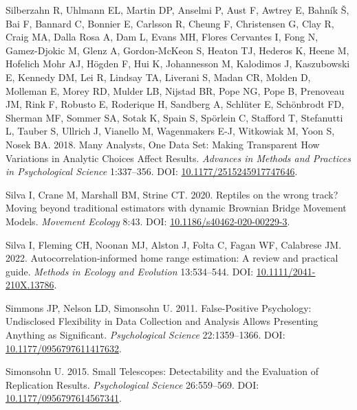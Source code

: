 \documentclass[10pt,a4paper]{article}
\newlength{\cslhangindent}
\newenvironment{CSLReferences}[2] %
 {\begin{list}{}{%
  \setlength{\itemindent}{0pt}
  \setlength{\leftmargin}{0pt}
  \setlength{\parsep}{0pt}
  \ifodd #1
   \setlength{\leftmargin}{\cslhangindent}
   \setlength{\itemindent}{-1\cslhangindent}
  \fi
  \setlength{\itemsep}{#2\baselineskip}}}
 {\end{list}}
\begin{document}
\begin{CSLReferences}{1}{0}
Silberzahn R, Uhlmann EL, Martin DP, Anselmi P, Aust F, Awtrey E, Bahník Š, Bai F, Bannard C, Bonnier E, Carlsson R, Cheung F, Christensen G, Clay R, Craig MA, Dalla Rosa A, Dam L, Evans MH, Flores Cervantes I, Fong N, Gamez-Djokic M, Glenz A, Gordon-McKeon S, Heaton TJ, Hederos K, Heene M, Hofelich Mohr AJ, Högden F, Hui K, Johannesson M, Kalodimos J, Kaszubowski E, Kennedy DM, Lei R, Lindsay TA, Liverani S, Madan CR, Molden D, Molleman E, Morey RD, Mulder LB, Nijstad BR, Pope NG, Pope B, Prenoveau JM, Rink F, Robusto E, Roderique H, Sandberg A, Schlüter E, Schönbrodt FD, Sherman MF, Sommer SA, Sotak K, Spain S, Spörlein C, Stafford T, Stefanutti L, Tauber S, Ullrich J, Vianello M, Wagenmakers E-J, Witkowiak M, Yoon S, Nosek BA. 2018. Many {Analysts}, {One} {Data} {Set}: {Making} {Transparent} {How} {Variations} in {Analytic} {Choices} {Affect} {Results}. \emph{Advances in Methods and Practices in Psychological Science} 1:337--356. DOI: \href{https://doi.org/10.1177/2515245917747646}{10.1177/2515245917747646}.

Silva I, Crane M, Marshall BM, Strine CT. 2020. Reptiles on the wrong track? {Moving} beyond traditional estimators with dynamic {Brownian} {Bridge} {Movement} {Models}. \emph{Movement Ecology} 8:43. DOI: \href{https://doi.org/10.1186/s40462-020-00229-3}{10.1186/s40462-020-00229-3}.

Silva I, Fleming CH, Noonan MJ, Alston J, Folta C, Fagan WF, Calabrese JM. 2022. Autocorrelation‐informed home range estimation: {A} review and practical guide. \emph{Methods in Ecology and Evolution} 13:534--544. DOI: \href{https://doi.org/10.1111/2041-210X.13786}{10.1111/2041-210X.13786}.

Simmons JP, Nelson LD, Simonsohn U. 2011. False-{Positive} {Psychology}: {Undisclosed} {Flexibility} in {Data} {Collection} and {Analysis} {Allows} {Presenting} {Anything} as {Significant}. \emph{Psychological Science} 22:1359--1366. DOI: \href{https://doi.org/10.1177/0956797611417632}{10.1177/0956797611417632}.

Simonsohn U. 2015. Small {Telescopes}: {Detectability} and the {Evaluation} of {Replication} {Results}. \emph{Psychological Science} 26:559--569. DOI: \href{https://doi.org/10.1177/0956797614567341}{10.1177/0956797614567341}.


\end{CSLReferences}
\end{document}
